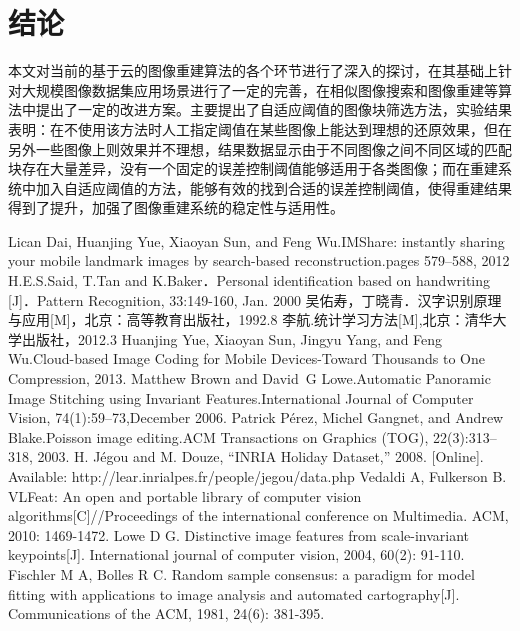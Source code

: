 \documentclass[UTF8]{csoarticle}
\begin{document}
\section{结论}

本文对当前的基于云的图像重建算法的各个环节进行了深入的探讨，在其基础上针对大规模图像数据集应用场景进行了一定的完善，在相似图像搜索和图像重建等算法中提出了一定的改进方案。主要提出了自适应阈值的图像块筛选方法，实验结果表明：在不使用该方法时人工指定阈值在某些图像上能达到理想的还原效果，但在另外一些图像上则效果并不理想，结果数据显示由于不同图像之间不同区域的匹配块存在大量差异，没有一个固定的误差控制阈值能够适用于各类图像；而在重建系统中加入自适应阈值的方法，能够有效的找到合适的误差控制阈值，使得重建结果得到了提升，加强了图像重建系统的稳定性与适用性。


\begin{thebibliography}{8} %
     Lican Dai, Huanjing Yue, Xiaoyan Sun, and Feng Wu.IMShare: instantly sharing your mobile landmark images by search-based reconstruction.pages 579--588, 2012
     H.E.S.Said, T.Tan and K.Baker．Personal identification based on handwriting [J]．Pattern Recognition, 33:149-160, Jan. 2000
     吴佑寿，丁晓青．汉字识别原理与应用[M]，北京：高等教育出版社，1992.8
     李航.统计学习方法[M],北京：清华大学出版社，2012.3
     Huanjing Yue, Xiaoyan Sun, Jingyu Yang, and Feng Wu.Cloud-based Image Coding for Mobile Devices-Toward Thousands to One Compression, 2013.
     Matthew Brown and David~G Lowe.Automatic Panoramic Image Stitching using Invariant Features.International Journal of Computer Vision, 74(1):59--73,December 2006.
     Patrick P{\'e}rez, Michel Gangnet, and Andrew Blake.Poisson image editing.ACM Transactions on Graphics (TOG), 22(3):313--318, 2003.
     H. Jégou and M. Douze, “INRIA Holiday Dataset,” 2008. [Online]. Available: http://lear.inrialpes.fr/people/jegou/data.php
     Vedaldi A, Fulkerson B. VLFeat: An open and portable library of computer vision algorithms[C]//Proceedings of the international conference on Multimedia. ACM, 2010: 1469-1472.
     Lowe D G. Distinctive image features from scale-invariant keypoints[J]. International journal of computer vision, 2004, 60(2): 91-110.
     Fischler M A, Bolles R C. Random sample consensus: a paradigm for model fitting with applications to image analysis and automated cartography[J]. Communications of the ACM, 1981, 24(6): 381-395.



\end{thebibliography}
\end{document}
